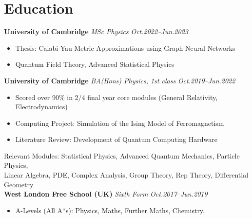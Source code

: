 \documentclass[11pt,a4paper,roman]{moderncv}        %
\begin{document}
\makecvtitle

\section{Education}

\textbf{University of Cambridge} \textit{MSc Physics} \hfill \textit{Oct.2022--Jun.2023}
\vspace*{1mm}
\begin{itemize}
    \item Thesis: Calabi-Yau Metric Approximations using Graph Neural Networks
    \item Quantum Field Theory, Advanced Statistical Physics
\end{itemize}

\vspace*{3mm}


\textbf{University of Cambridge} \textit{BA(Hons) Physics, 1st class} \hfill \textit{Oct.2019--Jun.2022}
\vspace*{1mm}
\begin{itemize}
    \item Scored over 90\% in 2/4 final year core modules (General Relativity, Electrodynamics)
	\item Computing Project: Simulation of the Ising Model of Ferromagnetism
	\item Literature Review: Development of Quantum Computing Hardware\\
\end{itemize}

Relevant Modules: Statistical Physics, Advanced Quantum Mechanics, Particle Physics,\\
Linear Algebra, PDE, Complex Analysis, Group Theory, Rep Theory, Differential Geometry\\

\textbf{West London Free School (UK)} \textit{Sixth Form} \hfill \textit{Oct.2017--Jun.2019}
\vspace*{1mm}
\begin{itemize}
\item{A-Levels (All A*s): Physics, Maths, Further Maths, Chemistry.}
\end{itemize}
\vspace*{3mm}
\end{document}
